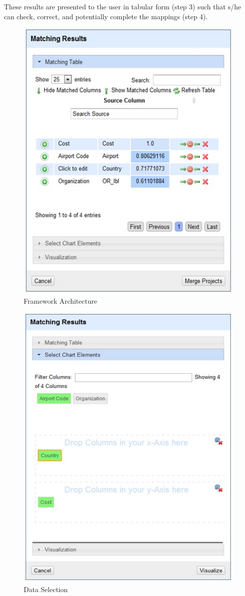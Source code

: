 \documentclass{sig-alternate}
\begin{document}
These results are presented to the user in tabular form (step 3) such that s/he can check, correct, and potentially complete the mappings (step 4).
\begin{figure}[ht!]
  \centering
    \includegraphics[scale=0.6]{1.jpg}
  \caption{Framework Architecture}
\end{figure}
\begin{figure}[ht!]
  \centering
    \includegraphics[scale=0.6]{2.jpg}
  \caption{Data Selection}
\end{figure}
\end{document}
